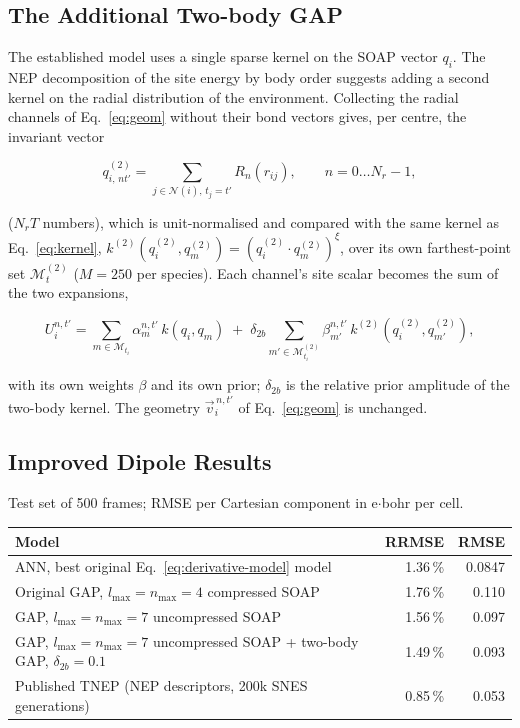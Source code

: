 \documentclass[11pt,a4paper]{article}
\begin{document}
\subsection{The Additional Two-body GAP}\label{sec:2b}

The established model uses a single sparse kernel on the SOAP vector $q_i$. The
NEP decomposition of the site energy by body order suggests adding a second kernel on the
radial distribution of the environment. Collecting the radial channels of Eq.~\ref{eq:geom}
without their bond vectors gives, per centre, the invariant vector

\begin{equation}
q^{(2)}_{i,\,n t'} = \sum_{j \in \mathcal{N}(i),\, t_j = t'} R_n(r_{ij}),
\qquad n = 0 \ldots N_r-1,
\label{eq:2b-desc}
\end{equation}

($N_r T$ numbers), which is unit-normalised and compared with the same kernel as
Eq.~\ref{eq:kernel}, $k^{(2)}(q^{(2)}_i, q^{(2)}_{m}) = (q^{(2)}_i \cdot q^{(2)}_{m})^{\xi}$, over its
own farthest-point set $\mathcal{M}^{(2)}_t$ ($M=250$ per species). Each channel's site scalar becomes the sum of the two expansions,

\begin{equation}
U_i^{n,t'} = \sum_{m \in \mathcal{M}_{t_i}} \alpha_m^{n,t'}\, k(q_i, q_m)
\;+\;\delta_{2b} \sum_{m' \in \mathcal{M}^{(2)}_{t_i}} \beta_{m'}^{n,t'}\, k^{(2)}(q^{(2)}_i, q^{(2)}_{m'}),
\label{eq:2b-site}
\end{equation}

with its own weights $\beta$ and its own prior; $\delta_{2b}$ is the relative prior amplitude of the
two-body kernel. The geometry $\vec v_i^{\,n,t'}$ of Eq.~\ref{eq:geom} is unchanged.

\subsection{Improved Dipole Results}\label{sec:dip-results}

Test set of 500 frames; RMSE per Cartesian component in e$\cdot$bohr per cell.

\begin{center}
\begin{tabular}{p{7.6cm}rr}
\hline
Model & RRMSE & RMSE \\
\hline
ANN, best original Eq.~\ref{eq:derivative-model} model & 1.36\,\% & 0.0847 \\ %
Original GAP, $l_{\max}=n_{\max}=4$ compressed SOAP & 1.76\,\% & 0.110 \\
GAP, $l_{\max}=n_{\max}=7$ uncompressed SOAP & 1.56\,\% & 0.097 \\
GAP, $l_{\max}=n_{\max}=7$ uncompressed SOAP + two-body GAP, $\delta_{2b}=0.1$ & 1.49\,\% & 0.093 \\
Published TNEP (NEP descriptors, 200k SNES generations) & 0.85\,\% & 0.053 \\
\hline
\end{tabular}
\end{center}
\end{document}
